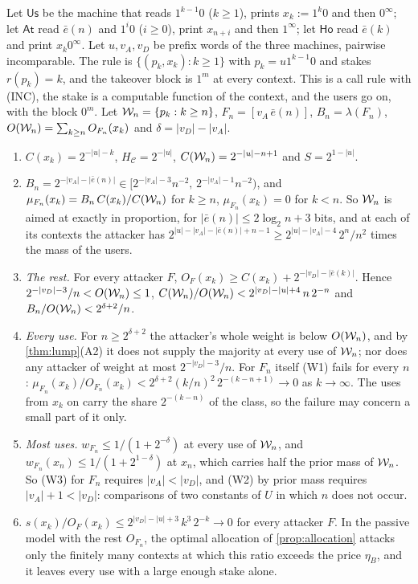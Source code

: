 \begin{example}\label{ex:stakes}
Let $\mathsf{Us}$ be the machine that reads $1^{k-1}0$ ($k\ge1$), prints $x_k:=1^k0$ and then $0^\infty$; let
$\mathsf{At}$ read $\bar e(n)$ and $1^i0$ ($i\ge0$), print $x_{n+i}$ and then $1^\infty$; let $\mathsf{Ho}$
read $\bar e(k)$ and print $x_k0^\infty$. Let $u,v_A,v_D$ be prefix words of the three machines, pairwise
incomparable. The rule is $\{(p_k,x_k):k\ge1\}$ with $p_k=u1^{k-1}0$ and stakes $r(p_k)=k$, and the takeover
block is $1^m$ at every context. This is a call rule with (INC), the stake is a computable function of the
context, and the users go on, with the block $0^m$. Let $\mathcal W_n=\{p_k:k\ge n\}$, $F_n=[v_A\,\bar e(n)]$,
$B_n=\lambda(F_n)$, $O(\mathcal W_n)=\sum_{k\ge n}O_{F_n}(x_k)$ and $\delta=|v_D|-|v_A|$.
\begin{enumerate}[label=(\alph*),leftmargin=2em,itemsep=1pt,topsep=2pt]
\item $C(x_k)=2^{-|u|-k}$, $H_{\mathcal C}=2^{-|u|}$, $C(\mathcal W_n)=2^{-|u|-n+1}$ and $S=2^{1-|u|}$.
\item $B_n=2^{-|v_A|-|\bar e(n)|}\in[2^{-|v_A|-3}n^{-2},\,2^{-|v_A|-1}n^{-2})$, and
$\mu_{F_n}(x_k)=B_n\,C(x_k)/C(\mathcal W_n)$ for $k\ge n$, $\mu_{F_n}(x_k)=0$ for $k<n$. So $\mathcal W_n$ is aimed at
exactly in proportion, for $|\bar e(n)|\le2\log_2n+3$ bits, and at each of its contexts the attacker has
$2^{|u|-|v_A|-|\bar e(n)|+n-1}\ge2^{|u|-|v_A|-4}\,2^n/n^2$ times the mass of the users.
\item \emph{The rest.} For every attacker $F$, $O_F(x_k)\ge C(x_k)+2^{-|v_D|-|\bar e(k)|}$. Hence
$2^{-|v_D|-3}/n<O(\mathcal W_n)\le1$, $C(\mathcal W_n)/O(\mathcal W_n)<2^{|v_D|-|u|+4}\,n\,2^{-n}$ and
$B_n/O(\mathcal W_n)<2^{\delta+2}/n$.
\item \emph{Every use.} For $n\ge2^{\delta+2}$ the attacker's whole weight is below $O(\mathcal W_n)$, and by
\cref{thm:lump}(A2) it does not supply the majority at every use of $\mathcal W_n$; nor does any attacker of weight
at most $2^{-|v_D|-3}/n$. For $F_n$ itself (W1) fails for every $n$:
$\mu_{F_n}(x_k)/O_{F_n}(x_k)<2^{\delta+2}(k/n)^2\,2^{-(k-n+1)}\to0$ as $k\to\infty$. The uses from $x_k$ on
carry the share $2^{-(k-n)}$ of the class, so the failure may concern a small part of it only.
\item \emph{Most uses.} $w_{F_n}\le1/(1+2^{-\delta})$ at every use of $\mathcal W_n$, and
$w_{F_n}(x_n)\le1/(1+2^{1-\delta})$ at $x_n$, which carries half the prior mass of $\mathcal W_n$. So (W3) for $F_n$
requires $|v_A|<|v_D|$, and (W2) by prior mass requires $|v_A|+1<|v_D|$: comparisons of two constants of $U$
in which $n$ does not occur.
\item $s(x_k)/O_F(x_k)\le2^{|v_D|-|u|+3}\,k^3\,2^{-k}\to0$ for every attacker $F$. In the passive model with
the rest $O_{F_n}$, the optimal allocation of \cref{prop:allocation} attacks only the finitely many contexts
at which this ratio exceeds the price $\eta_B$, and it leaves every use with a large enough stake alone.
\end{enumerate}\end{example}
